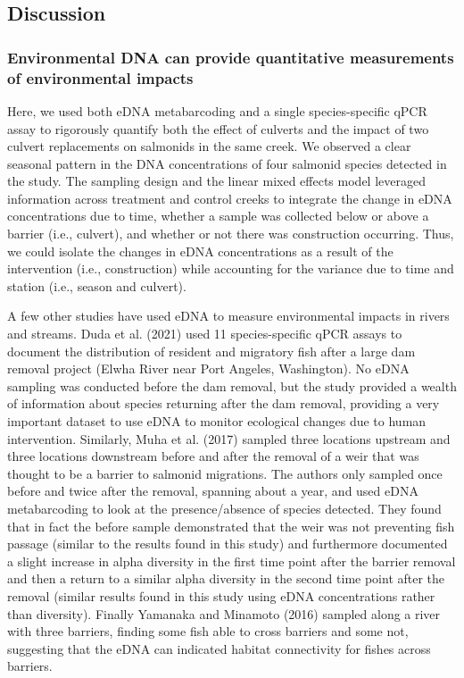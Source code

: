 \documentclass[
]{article}
\begin{document}
\hypertarget{discussion}{%
\subsection{Discussion}\label{discussion}}

\hypertarget{environmental-dna-can-provide-quantitative-measurements-of-environmental-impacts}{%
\subsubsection{Environmental DNA can provide quantitative measurements
of environmental
impacts}\label{environmental-dna-can-provide-quantitative-measurements-of-environmental-impacts}}

Here, we used both eDNA metabarcoding and a single species-specific qPCR
assay to rigorously quantify both the effect of culverts and the impact
of two culvert replacements on salmonids in the same creek. We observed
a clear seasonal pattern in the DNA concentrations of four salmonid
species detected in the study. The sampling design and the linear mixed
effects model leveraged information across treatment and control creeks
to integrate the change in eDNA concentrations due to time, whether a
sample was collected below or above a barrier (i.e., culvert), and
whether or not there was construction occurring. Thus, we could isolate
the changes in eDNA concentrations as a result of the intervention
(i.e., construction) while accounting for the variance due to time and
station (i.e., season and culvert).

A few other studies have used eDNA to measure environmental impacts in
rivers and streams. Duda et al. (2021) used 11 species-specific qPCR
assays to document the distribution of resident and migratory fish after
a large dam removal project (Elwha River near Port Angeles, Washington).
No eDNA sampling was conducted before the dam removal, but the study
provided a wealth of information about species returning after the dam
removal, providing a very important dataset to use eDNA to monitor
ecological changes due to human intervention. Similarly, Muha et al.
(2017) sampled three locations upstream and three locations downstream
before and after the removal of a weir that was thought to be a barrier
to salmonid migrations. The authors only sampled once before and twice
after the removal, spanning about a year, and used eDNA metabarcoding to
look at the presence/absence of species detected. They found that in
fact the before sample demonstrated that the weir was not preventing
fish passage (similar to the results found in this study) and
furthermore documented a slight increase in alpha diversity in the first
time point after the barrier removal and then a return to a similar
alpha diversity in the second time point after the removal (similar
results found in this study using eDNA concentrations rather than
diversity). Finally Yamanaka and Minamoto (2016) sampled along a river
with three barriers, finding some fish able to cross barriers and some
not, suggesting that the eDNA can indicated habitat connectivity for
fishes across barriers.
\end{document}
